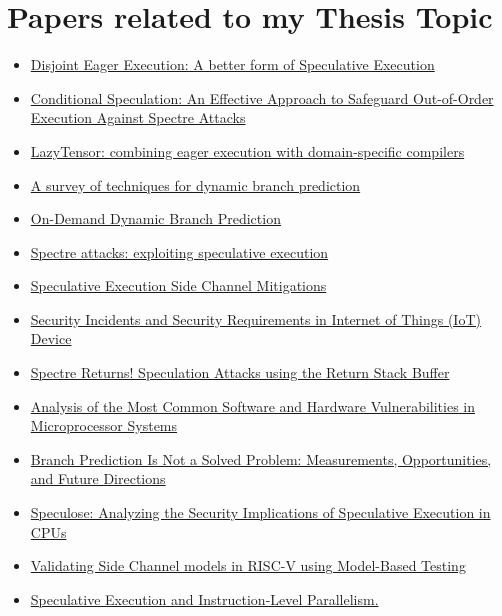 \documentclass{article}
\begin{document}
\section[short]{Papers related to my Thesis Topic}
\begin{itemize}
      \item \href{https://dl.acm.org/doi/abs/10.1145/511120.511124}{Disjoint Eager Execution: A better form of Speculative Execution}
      \item \href{https://ieeexplore.ieee.org/abstract/document/8675250?casa_token=YjoisDX1IRwAAAAA:gv1daTh5EZVaBwsTjxT-RELfEqW9nSsa1EGm-3rsmnb6R29MLx-8vi9_0Ur-CMtMU2pX8zOkYSS-aA}{Conditional Speculation: An Effective Approach to Safeguard Out-of-Order Execution Against Spectre Attacks}
      \item \href{https://arxiv.org/abs/2102.13267}{LazyTensor: combining eager execution with domain-specific compilers}
      \item \href{https://onlinelibrary.wiley.com/doi/full/10.1002/cpe.4666?casa_token=qMkXDp1xwAEAAAAA%3ACaMpxxl9u_leKTAwagbxIzd30YAlxzSvOtuL94-3AvIXPzJDp_-NRJiK92sEZyp4g7UhyP5OXBmtl7E}{A survey of techniques for dynamic branch prediction}
      \item \href{https://ieeexplore.ieee.org/abstract/document/6834760?casa_token=lHuqEKUMvOkAAAAA:xveFkDrIhIB1PzLmKiQk5MmMlblFmNzSpknsgQ5LQH08IL22HRKzy78neZVXIgbcIa900BGc1CnyaA}{On-Demand Dynamic Branch Prediction}
      \item \href{https://dl.acm.org/doi/abs/10.1145/3399742}{Spectre attacks: exploiting speculative execution}
      \item \href{https://www.intel.com/content/dam/develop/external/us/en/documents/336996-speculative-execution-side-channel-mitigations.pdf}{Speculative Execution Side Channel Mitigations}
      \item \href{https://www.igi-global.com/gateway/chapter/337101}{Security Incidents and Security Requirements in Internet of Things (IoT) Device}
      \item \href{https://www.usenix.org/conference/woot18/presentation/koruyeh}{Spectre Returns! Speculation Attacks using the Return Stack Buffer}
      \item \href{https://ieeexplore.ieee.org/abstract/document/9208037}{Analysis of the Most Common Software and Hardware Vulnerabilities in Microprocessor Systems}
      \item \href{https://arxiv.org/abs/1906.08170}{Branch Prediction Is Not a Solved Problem: Measurements, Opportunities, and Future Directions}
      \item \href{https://arxiv.org/abs/1801.04084}{Speculose: Analyzing the Security Implications of Speculative Execution in CPUs}
      \item \href{https://www.diva-portal.org/smash/get/diva2:1615024/FULLTEXT01.pdf}{Validating Side Channel models in RISC-V using Model-Based Testing}
      \item \href{https://citeseerx.ist.psu.edu/document?repid=rep1&type=pdf&doi=f0692dd6e23eb7cceb09ffcf5757ab645381819e}{Speculative Execution and Instruction-Level Parallelism.}
\end{itemize}
\end{document}
